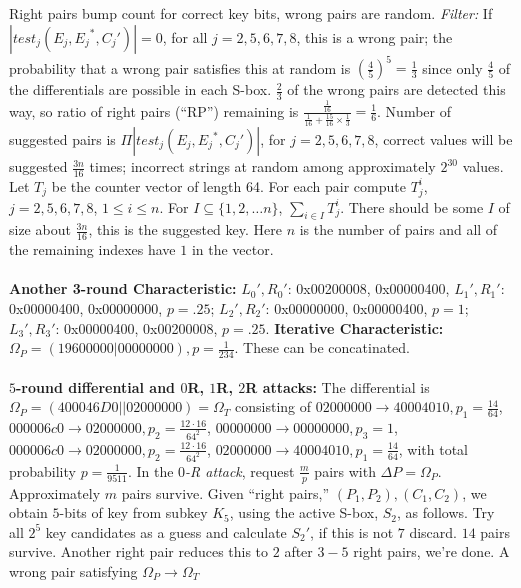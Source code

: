 Right pairs bump count for correct key bits, wrong pairs are random.  
\emph{Filter:}   If $|test_j (E_j , {E_j}^*, C_j ' )| = 0 $, for all  $j= 2,5,6,7,8$, this is a
wrong pair; the probability that a wrong pair satisfies this at random is 
$({\frac {4}{5}})^5 = {\frac 1 3}$ since only ${\frac 4 5}$ of the differentials are possible
in each S-box.  
${\frac 2 3}$ of the wrong pairs are detected this way, so
ratio of right pairs (``RP'') remaining is ${\frac {\frac 1 {16}} {{\frac 1 {16}} +
{\frac {15} {16}} \times {\frac 1 3}}}= {\frac 1 6}$.
Number of suggested pairs is
$\Pi |test_j (E_j , {E_j}^*, C_j ' )| $, for $j= 2,5,6,7,8$, correct values
will be suggested ${\frac {3n} {16}}$ times; incorrect strings at random
among approximately $2^{30}$ values.  Let $T_j$ be the counter vector of length 64.
For each pair compute $T^i_j$, $j= 2,5,6,7,8$, $1 \leq i \leq n$.  For
$I \subseteq \{ 1, 2, \ldots n \}$, $\sum_{i \in I} T^i_j$.  There
should be some $I$ of size about ${\frac {3n} {16}}$, this is the
suggested key.  Here $n$ is the number of pairs and
all of the remaining indexes have $1$ in the vector.
\\
\\
{\bf Another 3-round Characteristic:}
$L_0 ' , R_0 '$: 0x00200008, 0x00000400,
$L_1 ' , R_1 '$: 0x00000400, 0x00000000, $p= .25$;
$L_2 ' , R_2 '$: 0x00000000, 0x00000400, $p= 1$;
$L_3 ' , R_3 '$: 0x00000400, 0x00200008, $p= .25$.
{\bf Iterative Characteristic:} $\Omega_P= (19 60 00 00 | 00 00 00 00), p= {\frac 1 {234}}$.
These can be concatinated.
\\
\\
{\bf $5$-round differential and $0$R, $1$R, $2$R attacks:}
The differential is
$\Omega_P= (40 00 46 D0 || 02 00 00 00)= \Omega_T$ consisting of
$02 00 00 00 \rightarrow 40 00 40 10, p_1= {\frac {14} {64}}$,
$00 00 06 c0 \rightarrow 02 00 00 00, p_2= {\frac {12 \cdot 16} {64^2}}$,
$00 00 00 00 \rightarrow 00 00 00 00, p_3= 1$,
$00 00 06 c0 \rightarrow 02 00 00 00, p_2= {\frac {12 \cdot 16} {64^2}}$,
$02 00 00 00 \rightarrow 40 00 40 10, p_1= {\frac {14} {64}}$, with total
probability $p= {\frac 1 {9511}}$.  
In the \emph{$0$-R attack}, 
request ${\frac m p}$ pairs with $\Delta P= \Omega_P$.
Approximately $m$ pairs survive.  Given ``right pairs,'' $(P_1, P_2), (C_1, C_2)$,
we obtain $5$-bits of key from subkey $K_5$, using the active S-box, $S_2$, as follows.
Try all $2^5$ key candidates as a guess and calculate $S_2'$, if this is not
$7$ discard.  $14$ pairs survive.  Another right pair reduces this to $2$ after
$3-5$ right pairs, we're done.  A wrong pair satisfying $\Omega_P \rightarrow \Omega_T$
